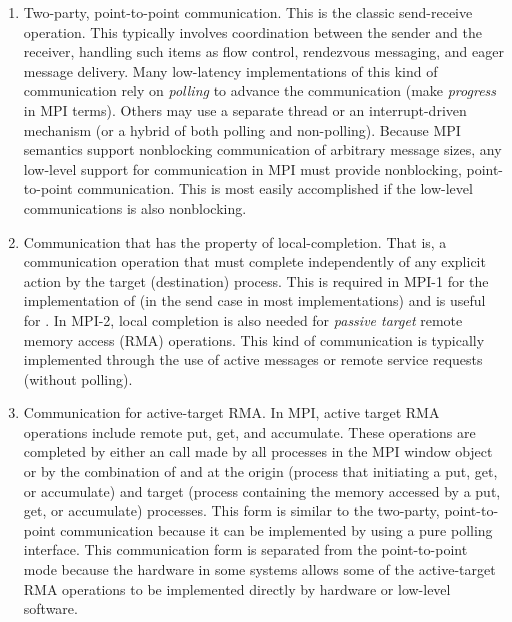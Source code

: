 \begin{enumerate}
\item Two-party, point-to-point communication.  This is the classic
send-receive operation.  This typically involves coordination between
the sender and the receiver, handling such items as flow control,
rendezvous messaging, and eager message delivery.  Many low-latency
implementations of this kind of communication rely on \emph{polling}
to advance the communication (make \emph{progress} in
MPI terms). 
Others may use a separate thread or an interrupt-driven mechanism (or
a hybrid of both polling and non-polling). 
Because MPI semantics support nonblocking communication of arbitrary
message sizes, any low-level support for communication in MPI must
provide nonblocking, point-to-point communication.  This is most
easily accomplished if the low-level communications is also
nonblocking.

\item Communication that has the property of local-completion. That
is, a communication operation that must complete independently of any
explicit action by the target (destination) process.  This is required
in MPI-1 for the implementation of  (in the send
case in most implementations) and is useful for .
In MPI-2, local completion is also needed for \emph{passive target}
remote memory access (RMA) operations.  This kind of communication is
typically implemented through the use of active messages or remote
service requests (without polling).

\item Communication for active-target RMA.  In MPI, active target RMA
operations include remote put, get, and accumulate.  These operations
are completed by either an  call made by all processes
in the MPI window object or by the combination of
 and  at the origin (process
that initiating a put, get, or accumulate) and target (process
containing the memory accessed by a put, get, or accumulate)
processes.  This form is similar to the two-party, point-to-point
communication because it can be implemented by using a pure polling
interface. This communication form is separated from the point-to-point
mode because the hardware in some systems allows some of the
active-target RMA operations to be implemented directly by hardware or
low-level software.


\end{enumerate}
